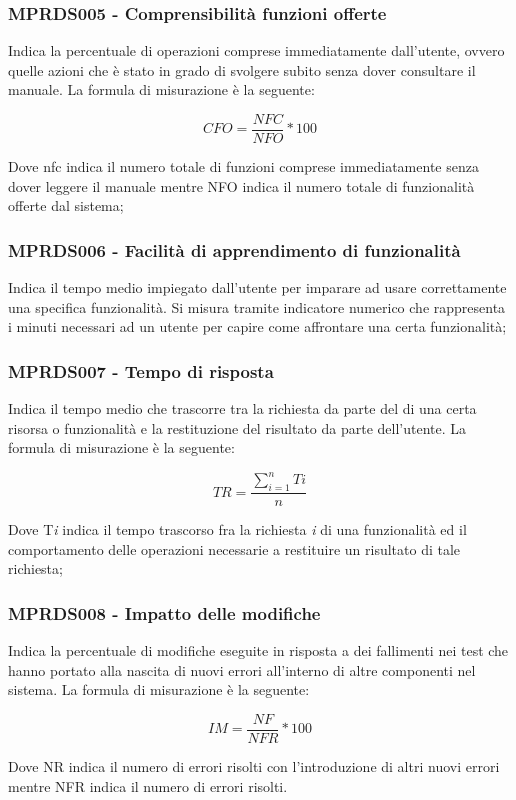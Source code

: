 {\subsubsection{MPRDS005 - Comprensibilità funzioni offerte}
Indica la percentuale di operazioni comprese immediatamente dall'utente, ovvero quelle azioni che è stato in grado di svolgere subito senza dover consultare il manuale. La formula di misurazione è la seguente:
\begin{center}
    \begin{displaymath}
        CFO = \frac{NFC}{NFO} * 100
    \end{displaymath}
\end{center}
Dove nfc indica il numero totale di funzioni comprese immediatamente senza dover leggere il manuale mentre NFO indica il numero totale di funzionalità offerte dal sistema;
\subsubsection{MPRDS006 - Facilità di apprendimento di funzionalità}
Indica il tempo medio impiegato dall'utente per imparare ad usare correttamente una specifica funzionalità. Si misura tramite indicatore numerico che rappresenta i minuti necessari ad un utente per capire come affrontare una certa funzionalità;
\subsubsection{MPRDS007 - Tempo di risposta}
Indica il tempo medio che trascorre tra la richiesta da parte del  di una certa risorsa o funzionalità e la restituzione del risultato da parte dell'utente. La formula di misurazione è la seguente:
\begin{center}
    \begin{displaymath}
        TR = \frac{\sum\limits_{i=1}^n Ti}{n}
    \end{displaymath}
\end{center}
Dove T\textit{i} indica il tempo trascorso fra la richiesta \textit{i} di una funzionalità ed il comportamento delle operazioni necessarie a restituire un risultato di tale richiesta;
\subsubsection{MPRDS008 - Impatto delle modifiche}
Indica la percentuale di modifiche eseguite in risposta a dei fallimenti nei test che hanno portato alla nascita di nuovi errori all'interno di altre componenti nel sistema. La formula di misurazione è la seguente:
\begin{center}
    \begin{displaymath}
        IM = \frac{NF}{NFR} * 100
    \end{displaymath}
\end{center}
Dove NR indica il numero di errori risolti con l'introduzione di altri nuovi errori mentre NFR indica il numero di errori risolti.
}

